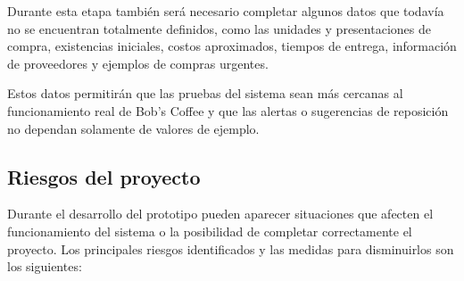 \documentclass[11pt,letterpaper]{article}
\begin{document}
Durante esta etapa también será necesario completar algunos datos que todavía no se encuentran totalmente definidos, como las unidades y presentaciones de compra, existencias iniciales, costos aproximados, tiempos de entrega, información de proveedores y ejemplos de compras urgentes.

Estos datos permitirán que las pruebas del sistema sean más cercanas al funcionamiento real de Bob’s Coffee y que las alertas o sugerencias de reposición no dependan solamente de valores de ejemplo.

\subsection{Riesgos del proyecto}

Durante el desarrollo del prototipo pueden aparecer situaciones que afecten el funcionamiento del sistema o la posibilidad de completar correctamente el proyecto. Los principales riesgos identificados y las medidas para disminuirlos son los siguientes:
\end{document}
